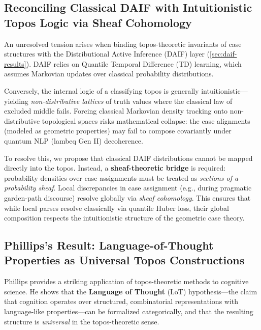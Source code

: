 \documentclass[
]{article}
\begin{document}
\subsection{Reconciling Classical DAIF with Intuitionistic Topos Logic
via Sheaf
Cohomology}\label{reconciling-classical-daif-with-intuitionistic-topos-logic-via-sheaf-cohomology}

An unresolved tension arises when binding topos-theoretic invariants of
case structures with the Distributional Active Inference (DAIF) layer
(\autoref{sec:daif-results}). DAIF relies on Quantile Temporal
Difference (TD) learning, which assumes Markovian updates over classical
probability distributions.

Conversely, the internal logic of a classifying topos is generally
intuitionistic---yielding \emph{non-distributive lattices} of truth
values where the classical law of excluded middle fails. Forcing
classical Markovian density tracking onto non-distributive topological
spaces risks mathematical collapse: the case alignments (modeled as
geometric properties) may fail to compose covariantly under quantum NLP
(lambeq Gen II) decoherence.

To resolve this, we propose that classical DAIF distributions cannot be
mapped directly into the topos. Instead, a \textbf{sheaf-theoretic
bridge} is required: probability densities over case assignments must be
treated as \emph{sections of a probability sheaf}. Local discrepancies
in case assignment (e.g., during pragmatic garden-path discourse)
resolve globally via \emph{sheaf cohomology}. This ensures that while
local parses resolve classically via quantile Huber loss, their global
composition respects the intuitionistic structure of the geometric case
theory.

\subsection{Phillips's Result: Language-of-Thought Properties as
Universal Topos
Constructions}\label{phillipss-result-language-of-thought-properties-as-universal-topos-constructions}

Phillips \citeyearpar{phillips2024lot} provides a striking application
of topos-theoretic methods to cognitive science. He shows that the
\textbf{Language of Thought} (LoT) hypothesis---the claim that cognition
operates over structured, combinatorial representations with
language-like properties---can be formalized categorically, and that the
resulting structure is \emph{universal} in the topos-theoretic sense.
\end{document}
